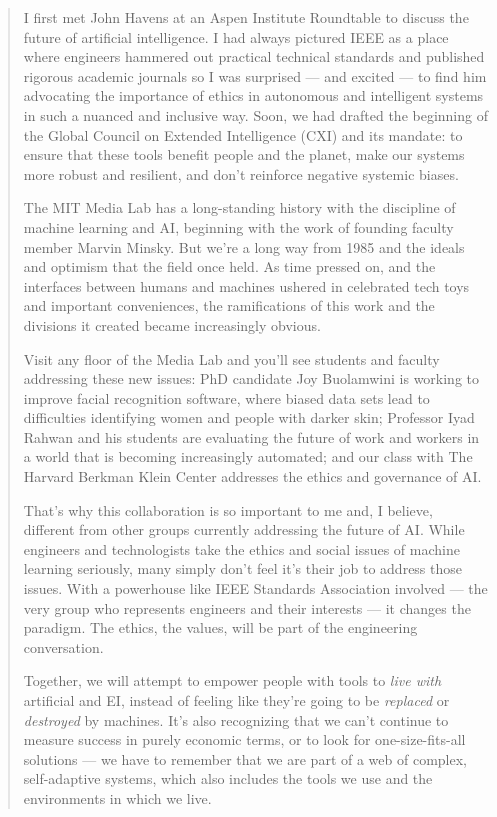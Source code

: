 \begin{quotation}
I first met John Havens at an Aspen Institute Roundtable to discuss the future of artificial intelligence. I had always pictured \ac{IEEE} as a place where engineers hammered out practical technical standards and published rigorous academic journals so I was surprised --- and excited --- to find him advocating the importance of ethics in autonomous and intelligent systems in such a nuanced and inclusive way. Soon, we had drafted the beginning of the Global Council on Extended Intelligence (CXI) and its mandate: to ensure that these tools benefit people and the planet, make our systems more robust and resilient, and don’t reinforce negative systemic biases.

The MIT Media Lab has a long-standing history with the discipline of machine learning and \ac{AI}, beginning with the work of founding faculty member Marvin Minsky. But we’re a long way from 1985 and the ideals and optimism that the field once held. As time pressed on, and the interfaces between humans and machines ushered in celebrated tech toys and important conveniences, the ramifications of this work and the divisions it created became increasingly obvious.

Visit any floor of the Media Lab and you'll see students and faculty addressing these new issues: PhD candidate Joy Buolamwini is working to improve facial recognition software, where biased data sets lead to difficulties identifying women and people with darker skin; Professor Iyad Rahwan and his students are evaluating the future of work and workers in a world that is becoming increasingly automated; and our class with The Harvard Berkman Klein Center addresses the ethics and governance of \ac{AI}.

That’s why this collaboration is so important to me and, I believe, different from other groups currently addressing the future of \ac{AI}. While engineers and technologists take the ethics and social issues of machine learning seriously, many simply don’t feel it’s their job to address those issues. With a powerhouse like \ac{IEEE} Standards Association involved --- the very group who represents engineers and their interests --- it changes the paradigm. The ethics, the values, will be part of the engineering conversation.

Together, we will attempt to empower people with tools to \textit{live with} artificial and \ac{EI}, instead of feeling like they’re going to be \textit{replaced} or \textit{destroyed} by machines. It’s also recognizing that we can’t continue to measure success in purely economic terms, or to look for one-size-fits-all solutions --- we have to remember that we are part of a web of complex, self-adaptive systems, which also includes the tools we use and the environments in which we live.


\end{quotation}
